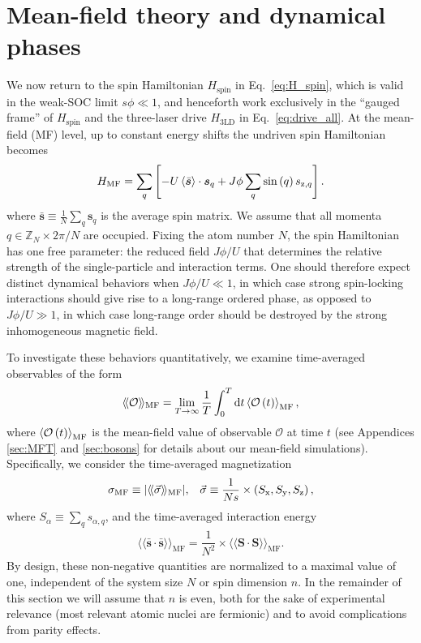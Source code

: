 \documentclass[nofootinbib,twocolumn]{revtex4-2}
\renewcommand{\t}{\text} %
\newcommand{\f}[2]{\dfrac{#1}{#2}} %
\newcommand{\p}[1]{\left(#1\right)} %
\renewcommand{\sp}[1]{\left[#1\right]} %
\newcommand{\bk}{\Braket} %
\renewcommand{\v}{\bm} %
\renewcommand{\c}{\cdot} %
\renewcommand{\dd}{\text{d}} %
\newcommand{\bbk}[1]{\langle\!\langle #1 \rangle\!\rangle}
\newcommand{\1}{\mathds{1}}
\newcommand{\x}{\text{x}}
\newcommand{\y}{\text{y}}
\newcommand{\z}{\text{z}}
\newcommand{\ZZ}{\mathbb{Z}}
\renewcommand{\O}{\mathcal{O}}
\newcommand{\MF}{\text{MF}}
\renewcommand{\ss}{\bar{\v s}\c\bar{\v s}}
\begin{document}
\section{Mean-field theory and dynamical phases}
\label{sec:mean_field}

We now return to the spin Hamiltonian $H_{\t{spin}}$ in Eq.~\eqref{eq:H_spin}, which is valid in the weak-SOC limit $s\phi\ll1$, and henceforth work exclusively in the ``gauged frame'' of $H_{\t{spin}}$ and the three-laser drive $H_{\t{3LD}}$ in Eq.~\eqref{eq:drive_all}.
At the mean-field (MF) level, up to constant energy shifts the undriven spin Hamiltonian becomes
\begin{align}
  H_\MF = \sum_q\sp{-U\bk{\bar{\v s}}\c\v s_q
    + J\phi \sum_q \sin\p{q} s_{\z,q}}.
  \label{eq:H_MF}
\end{align}
where $\bar{\v s}\equiv\frac1N\sum_q\v s_q$ is the average spin matrix.
We assume that all momenta $q\in\ZZ_N\times 2\pi/N$ are occupied.
Fixing the atom number $N$, the spin Hamiltonian has one free parameter: the reduced field $J\phi/U$ that determines the relative strength of the single-particle and interaction terms.
One should therefore expect distinct dynamical behaviors when $J\phi/U\ll1$, in which case strong spin-locking interactions should give rise to a long-range ordered phase, as opposed to $J\phi/U\gg1$, in which case long-range order should be destroyed by the strong inhomogeneous magnetic field.

To investigate these behaviors quantitatively, we examine time-averaged observables of the form
\begin{align}
  \bbk{\O}_\MF = \lim_{T\to\infty} \f1T \int_0^T \dd t \bk{\O\p{t}}_\MF,
\end{align}
where $\bk{\O\p{t}}_\MF$ is the mean-field value of observable $\O$ at time $t$ (see Appendices \ref{sec:MFT} and \ref{sec:bosons} for details about our mean-field simulations).
Specifically, we consider the time-averaged magnetization
\begin{align}
  \sigma_\MF \equiv \abs{\bbk{\vec\sigma}_\MF},
  &&
  \vec\sigma \equiv \f1{Ns} \times \p{S_\x,S_\y,S_\z},
\end{align}
where $S_\alpha \equiv \sum_q s_{\alpha,q}$, and the time-averaged interaction energy
\begin{align}
  \bbk{\ss}_\MF = \f1{N^2} \times \bbk{\v S\c\v S}_\MF.
\end{align}
By design, these non-negative quantities are normalized to a maximal value of one, independent of the system size $N$ or spin dimension $n$.
In the remainder of this section we will assume that $n$ is even, both for the sake of experimental relevance (most relevant atomic nuclei are fermionic) and to avoid complications from parity effects.
\end{document}
